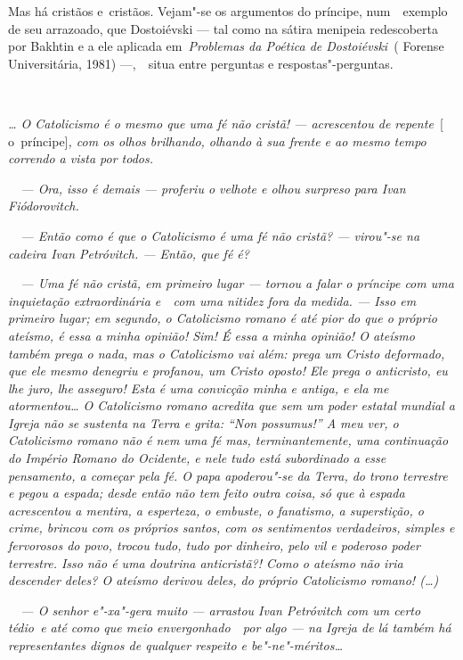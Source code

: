 Mas há cristãos e~cristãos. Vejam"-se os argumentos do príncipe,
num~~exemplo de seu arrazoado, que Dostoiévski --- tal como na sátira
menipeia redescoberta por Bakhtin e a ele aplicada em~\emph{Problemas da
Poética de Dostoiévski~}( Forense Universitária, 1981) ---,~~situa entre
perguntas e respostas"-perguntas.

\emph{~}

\emph{\ldots{} O Catolicismo é o mesmo que uma fé não cristã! --- acrescentou
de repente~}{[} o\emph{~}príncipe{]}\emph{, com os olhos brilhando,
olhando à sua frente e ao mesmo tempo correndo a vista por todos.}

\emph{~~--- Ora, isso é demais --- proferiu o velhote e olhou surpreso
para Ivan Fiódorovitch.}

\emph{~~--- Então como é que o Catolicismo é uma fé não
cristã? --- virou"-se na cadeira Ivan Petróvitch. --- Então, que fé é?}

\emph{~~--- Uma fé não cristã, em primeiro lugar --- tornou a falar o
príncipe com uma inquietação extraordinária e~~com uma nitidez fora da
medida. --- Isso em primeiro lugar; em segundo, o Catolicismo romano é
até pior do que o próprio ateísmo, é essa a minha opinião! Sim! É essa a
minha opinião! O ateísmo também prega o nada, mas o Catolicismo vai
além: prega um Cristo deformado, que ele mesmo denegriu e profanou, um
Cristo oposto! Ele prega o anticristo, eu lhe juro, lhe asseguro! Esta é
uma convicção minha e antiga, e ela me atormentou\ldots{} O Catolicismo romano
acredita que sem um poder estatal mundial a Igreja não se sustenta na
Terra e grita: ``Non possumus!'' A meu ver, o Catolicismo romano não é
nem uma fé mas, terminantemente, uma continuação do Império Romano do
Ocidente, e nele tudo está subordinado a esse pensamento, a começar pela
fé. O papa apoderou"-se da Terra, do trono terrestre e pegou a espada;
desde então não tem feito outra coisa, só que à espada acrescentou a
mentira, a esperteza, o embuste, o fanatismo, a superstição, o crime,
brincou com os próprios santos, com os sentimentos verdadeiros, simples
e fervorosos do povo, trocou tudo, tudo por dinheiro, pelo vil e
poderoso poder terrestre. Isso não é uma doutrina anticristã?! Como o
ateísmo não iria descender deles? O ateísmo derivou deles, do próprio
Catolicismo romano! (\ldots{})}

\emph{~~--- O senhor e"-xa"-gera muito --- arrastou Ivan Petróvitch com um
certo tédio~e até como que meio envergonhado~~por algo --- na Igreja de
lá também há representantes dignos de qualquer respeito e
be"-ne"-méritos\ldots{}}

